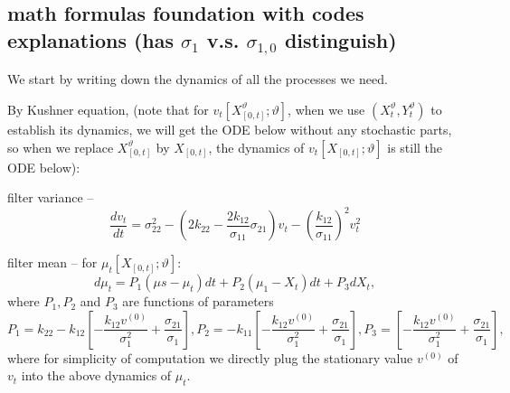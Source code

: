 \documentclass[11pt]{article}%
\theoremstyle{definition}
\begin{document}
\bigskip

\bigskip

\bigskip



\subsection{math formulas foundation with codes explanations (has $\sigma_{1}$
v.s. $\sigma_{1,0}$ distinguish)}

We start by writing down the dynamics of all the processes we need.

By Kushner equation, (note that for $v_{t}[X_{[0,t]}^{\vartheta};\vartheta]$,
when we use $(X_{t}^{\vartheta},Y_{t}^{\vartheta})$ to establish its dynamics,
we will get the ODE below without any stochastic parts, so when we replace
$X_{[0,t]}^{\vartheta}$ by $X_{[0,t]}$, the dynamics of $v_{t}[X_{[0,t]}%
;\vartheta]$ is still the ODE below):

filter variance --%
\[
\frac{dv_{t}}{dt}=\sigma_{22}^{2}-\left(  2k_{22}-\frac{2k_{12}}{\sigma_{11}%
}\sigma_{21}\right)  v_{t}-\left(  \frac{k_{12}}{\sigma_{11}}\right)
^{2}v_{t}^{2}%
\]


filter mean -- for $\mu_{t}[X_{[0,t]};\vartheta]$:%
\begin{equation}
d\mu_{t}=P_{1}\left(  \mu s-\mu_{t}\right)  dt+P_{2}\left(  \mu_{1}%
-X_{t}\right)  dt+P_{3}dX_{t},
\end{equation}
where $P_{1},P_{2}$ and $P_{3}$ are functions of parameters%
\[
P_{1}=k_{22}-k_{12}\left[  -\frac{k_{12}v^{\left(  0\right)  }}{\sigma_{1}%
^{2}}+\frac{\sigma_{21}}{\sigma_{1}}\right]  ,P_{2}=-k_{11}\left[
-\frac{k_{12}v^{\left(  0\right)  }}{\sigma_{1}^{2}}+\frac{\sigma_{21}}%
{\sigma_{1}}\right]  ,P_{3}=\left[  -\frac{k_{12}v^{\left(  0\right)  }%
}{\sigma_{1}^{2}}+\frac{\sigma_{21}}{\sigma_{1}}\right]  ,
\]
where for simplicity of computation we directly plug the stationary value
$v^{\left(  0\right)  }$ of $v_{t}$ into the above dynamics of $\mu_{t}$.
\end{document}
